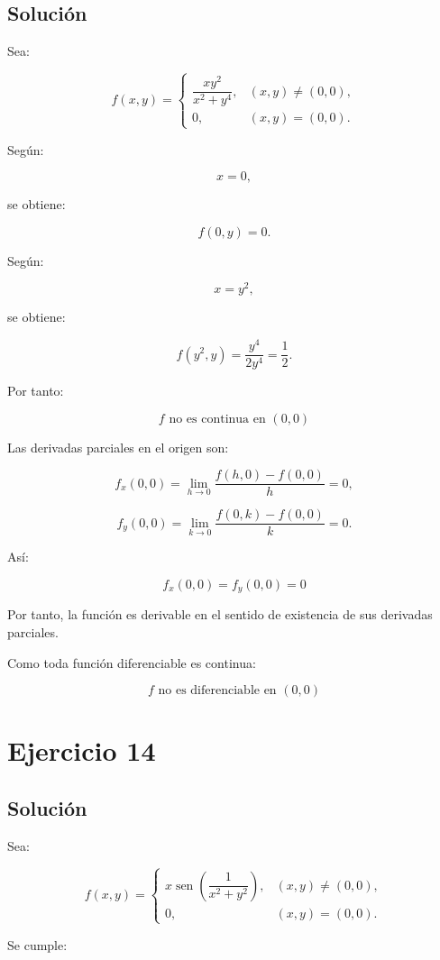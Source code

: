\documentclass[11pt,a4paper]{article}
\newcommand{\sen}{\operatorname{sen}}
\begin{document}
\subsection{Solución}

Sea:

\[
f(x,y)
=
\begin{cases}
\dfrac{xy^2}{x^2+y^4},
&
(x,y)\neq(0,0),\\[2mm]
0,
&
(x,y)=(0,0).
\end{cases}
\]

Según:

\[
x=0,
\]

se obtiene:

\[
f(0,y)=0.
\]

Según:

\[
x=y^2,
\]

se obtiene:

\[
f(y^2,y)
=
\frac{y^4}{2y^4}
=
\frac12.
\]

Por tanto:

\[
\boxed{
f\text{ no es continua en }(0,0)
}
\]

Las derivadas parciales en el origen son:

\[
f_x(0,0)
=
\lim_{h\to0}
\frac{f(h,0)-f(0,0)}{h}
=
0,
\]

\[
f_y(0,0)
=
\lim_{k\to0}
\frac{f(0,k)-f(0,0)}{k}
=
0.
\]

Así:

\[
\boxed{
f_x(0,0)=f_y(0,0)=0
}
\]

Por tanto, la función es derivable en el sentido de existencia de sus derivadas parciales.

Como toda función diferenciable es continua:

\[
\boxed{
f\text{ no es diferenciable en }(0,0)
}
\]

\section{Ejercicio 14}
\subsection{Solución}

Sea:

\[
f(x,y)
=
\begin{cases}
x\sen\left(
\dfrac1{x^2+y^2}
\right),
&
(x,y)\neq(0,0),\\[2mm]
0,
&
(x,y)=(0,0).
\end{cases}
\]

Se cumple:
\end{document}
